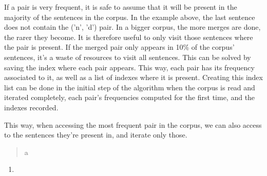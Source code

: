 If a pair is very frequent, it is safe to assume that it will be present in the majority of the sentences in the corpus. In the example above, the last sentence does not contain the ('n', 'd') pair. In a bigger corpus, the more merges are done, the rarer they become. It is therefore useful to only visit those sentences where the pair is present. If the merged pair only appears in 10\% of the corpus' sentences, it's a waste of resources to visit all sentences. This can be solved by saving the index where each pair appears. This way, each pair has its frequency associated to it, as well as a list of indexes where it is present. Creating this index list can be done in the initial step of the algorithm when the corpus is read and iterated completely, each pair's frequencies computed for the first time, and the indexes recorded.

This way, when accessing the most frequent pair in the corpus, we can also access to the sentences they're present in, and iterate only those.

\begin{quote}
	a\\
\end{quote}

\begin{enumerate}
	\item 
\end{enumerate}